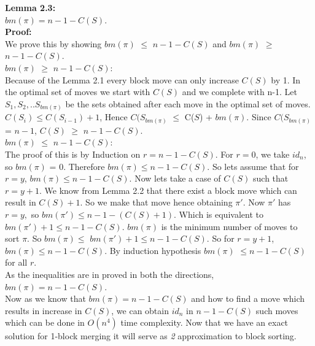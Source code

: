 \documentclass[BTech]{iitmdiss}
\begin{document}
\noindent
\textbf{Lemma 2.3:} \\
$bm(\pi) = n - 1 - C(S)$.\\
\textbf{Proof:}\\
We prove this by showing $bm(\pi)$ $\leq$ $n - 1 - C(S)$ and $bm(\pi)$ $\geq$ $n - 1 - C(S)$.\\
$bm(\pi)$ $\geq$ $n - 1 - C(S)$:\\ Because of the Lemma 2.1 every block move can only increase $C(S)$ by 1. In the optimal set of moves we start with $C(S)$ and we complete with n-1. Let $S_1 ,S_2,.. S_{bm(\pi)}$ be the sets obtained after each move in the optimal set of moves. $C(S_i) \leq C(S_{i-1}) + 1$, Hence $C(S_{bm(\pi)}$ $\leq$ C($S$) + $bm(\pi)$. Since $C(S_{bm(\pi)}$ = $n-1$, $C(S)$ $\geq$ $n-1-C(S).$\\
$bm(\pi)$ $\leq$ $n - 1 - C(S)$:\\ The proof of this is by Induction on $r = n-1-C(S).$ For $r = 0$, we take $id_n$, so $bm(\pi)$ = 0. Therefore $bm(\pi) \leq  n - 1 - C(S)$. So lets assume that for $r = y$, $bm(\pi) \leq  n-1-C(S)$. Now lets take a case of $C(S)$ such that $r = y+1$. We know from Lemma 2.2 that there exist a block move which can result in $C(S)+1$. So we make that move hence obtaining $\pi'$. Now $\pi'$ has $r = y,$ so $bm(\pi') \leq n-1-(C(S)+1)$. Which is equivalent to $bm(\pi') + 1 \leq  n-1-C(S)$. $bm(\pi)$ is the minimum number of moves to sort $\pi$. So $bm(\pi) \leq$ $bm(\pi') + 1 \leq  n-1-C(S)$. So for $r = y+1$, $bm(\pi) \leq n-1-C(S)$. By induction hypothesis $bm(\pi)$ $\leq n - 1 - C(S)$ for all $r$.\\
As the inequalities are in proved in both the directions, $bm(\pi) = n-1-C(S)$.\\
\noindent
Now as we know that $bm(\pi) = n-1-C(S)$ and how to find a move which results in increase in $C(S)$, we can obtain $id_n$ in $n-1-C(S)$ such moves which can be done in $O(n^4)$ time complexity. Now that we have an exact solution for 1-block merging it will serve as \textit{2} approximation to block sorting.
\end{document}
